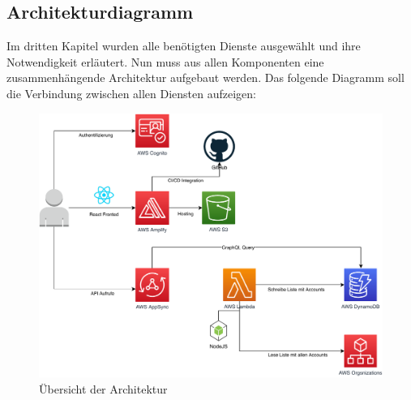 \subsection{Architekturdiagramm }

Im dritten Kapitel wurden alle benötigten Dienste ausgewählt und ihre Notwendigkeit erläutert.
Nun muss aus allen Komponenten eine zusammenhängende Architektur aufgebaut werden.
Das folgende Diagramm soll die Verbindung zwischen allen Diensten aufzeigen:

\begin{figure}[htbp]
    \centering
    \includegraphics[width=1.0\textwidth]{50-Implementierung/Architektur.pdf}
    \caption{Übersicht der Architektur}
    \label{fig:meine-grafik}
\end{figure}

